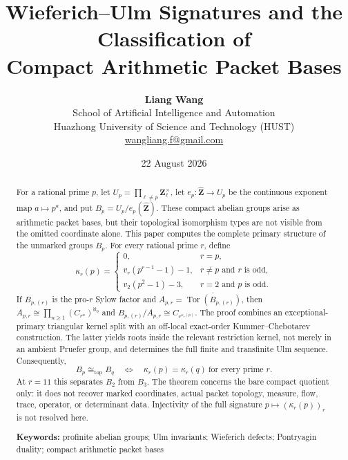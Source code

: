 \documentclass[11pt]{article}
\title{\textbf{Wieferich--Ulm Signatures and the Classification of\\
Compact Arithmetic Packet Bases}}
\author{\textbf{Liang Wang}\\
\small School of Artificial Intelligence and Automation\\
\small Huazhong University of Science and Technology (HUST)\\
\small \href{mailto:wangliang.f@gmail.com}{wangliang.f@gmail.com}}
\date{22 August 2026}
\theoremstyle{definition}
\begin{document}
\maketitle

\begin{center}
\end{center}

\begin{abstract}
For a rational prime $p$, let
$U_p=\prod_{\ell\ne p}\mathbf Z_\ell^\times$, let
$e_p:\widehat{\mathbf Z}\to U_p$ be the continuous exponent map
$a\mapsto p^a$, and put $B_p=U_p/e_p(\widehat{\mathbf Z})$.
These compact abelian groups arise as arithmetic packet bases, but their
topological isomorphism types are not visible from the omitted coordinate
alone.  This paper computes the complete primary structure of the unmarked
groups $B_p$.  For every rational prime $r$, define
\[
\kappa_r(p)=
\begin{cases}
0,&r=p,\\
v_r(p^{r-1}-1)-1,&r\ne p\text{ and }r\text{ is odd},\\
v_2(p^2-1)-3,&r=2\text{ and }p\text{ is odd}.
\end{cases}
\]
If $B_{p,(r)}$ is the pro-$r$ Sylow factor and
$A_{p,r}=\overline{\operatorname{Tor}(B_{p,(r)})}$, then
$A_{p,r}\cong\prod_{n\ge1}(C_{r^n})^{\aleph_0}$ and
$B_{p,(r)}/A_{p,r}\cong C_{r^{\kappa_r(p)}}$.
The proof combines an exceptional-primary triangular kernel split with an
off-local exact-order Kummer--Chebotarev construction.  The latter yields
roots inside the relevant restriction kernel, not merely in an ambient
Pruefer group, and determines the full finite and transfinite Ulm sequence.
Consequently,
\[
B_p\cong_{\mathrm{top}}B_q
\quad\Longleftrightarrow\quad
\kappa_r(p)=\kappa_r(q)\ \text{for every prime }r.
\]
At $r=11$ this separates $B_2$ from $B_3$.  The theorem concerns the bare
compact quotient only: it does not recover marked coordinates, actual packet
topology, measure, flow, trace, operator, or determinant data.  Injectivity of
the full signature $p\mapsto(\kappa_r(p))_r$ is not resolved here.

\medskip
\noindent\textbf{Keywords:} profinite abelian groups; Ulm invariants;
Wieferich defects; Pontryagin duality; compact arithmetic packet bases
\end{abstract}
\end{document}

